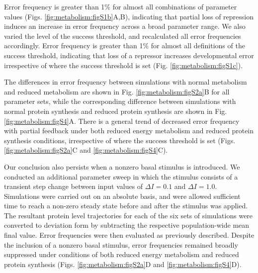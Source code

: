 Error frequency is greater than 1\% for almost all combinations of parameter values (Figs. \ref{fig:metabolism:figS1b}A,B), indicating that partial loss of repression induces an increase in error frequency across a broad parameter range. We also varied the level of the success threshold, and recalculated all error frequencies accordingly. Error frequency is greater than 1\% for almost all definitions of the success threshold, indicating that loss of a repressor increases developmental error irrespective of where the success threshold is set (Fig. \ref{fig:metabolism:figS1c}).

The differences in error frequency between simulations with normal metabolism and reduced metabolism are shown in Fig. \ref{fig:metabolism:figS2a}B for all parameter sets, while the corresponding difference between simulations with normal protein synthesis and reduced protein synthesis are shown in Fig. \ref{fig:metabolism:figS4}A. There is a general trend of decreased error frequency with partial feedback under both reduced energy metabolism and reduced protein synthesis conditions, irrespective of where the success threshold is set (Figs. \ref{fig:metabolism:figS2a}C and \ref{fig:metabolism:figS4}C).

Our conclusion also persists when a nonzero basal stimulus is introduced. We conducted an additional parameter sweep in which the stimulus consists of a transient step change between input values of $\Delta I=0.1$ and $\Delta I=1.0$. Simulations were carried out on an absolute basis, and were allowed sufficient time to reach a non-zero steady state before and after the stimulus was applied. The resultant protein level trajectories for each of the six sets of simulations were converted to deviation form by subtracting the respective population-wide mean final value. Error frequencies were then evaluated as previously described. Despite the inclusion of a nonzero basal stimulus, error frequencies remained broadly suppressed under conditions of both reduced energy metabolism and reduced protein synthesis (Figs. \ref{fig:metabolism:figS2a}D and \ref{fig:metabolism:figS4}D).

